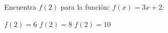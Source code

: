 
\question Encuentra $f(2)$ para la función: $f(x) = 3x + 2$:

  \begin{oneparchoices}
    \choice  $f(2) = 6$
    \CorrectChoice $f(2) = 8$
    \choice $f(2) = 10$
  \end{oneparchoices}
